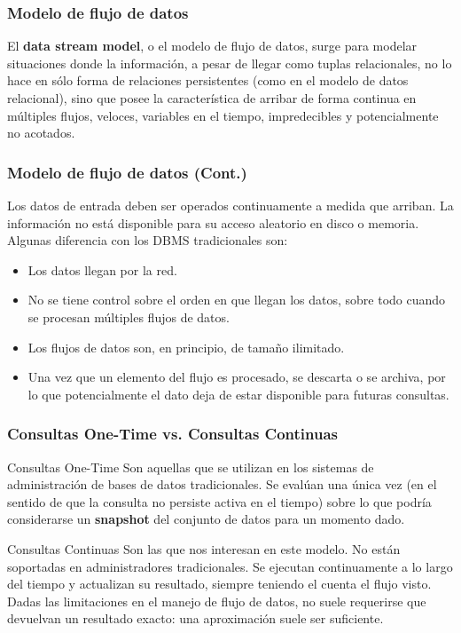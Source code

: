 
\begin{frame}
\frametitle{Modelo de flujo de datos}
\begin{block}{}
El \textbf{data stream model}, o el modelo de flujo de datos, surge para modelar situaciones donde la información, a pesar de llegar como tuplas relacionales, no lo hace en sólo forma de relaciones persistentes (como en el modelo de datos relacional), sino que posee la característica de arribar de forma continua en múltiples flujos, veloces, variables en el tiempo, impredecibles y potencialmente no acotados.\
\end{block}
\end{frame}

\begin{frame}
\frametitle{Modelo de flujo de datos (Cont.)}
Los datos de entrada deben ser operados continuamente a medida que arriban. La información no está disponible para su acceso aleatorio en disco o memoria. Algunas diferencia con los DBMS tradicionales son:
\begin{itemize}
\item Los datos llegan por la red.
\item No se tiene control sobre el orden en que llegan los datos, sobre todo cuando se procesan múltiples flujos de datos.
\item Los flujos de datos son, en principio, de tamaño ilimitado.
\item Una vez que un elemento del flujo es procesado, se descarta o se archiva, por lo que potencialmente el dato deja de estar disponible para futuras consultas.
\end{itemize} 
\end{frame}

\begin{frame}
\frametitle{Consultas One-Time vs. Consultas Continuas}

\begin{block}{Consultas One-Time}
Son aquellas que se utilizan en los sistemas de administración de bases de datos tradicionales. Se evalúan una única vez (en el sentido de que la consulta no persiste activa en el tiempo) sobre lo que podría considerarse un \textbf{snapshot} del conjunto de datos para un momento dado.
\end{block}

\begin{block}{Consultas Continuas}
Son las que nos interesan en este modelo. No están soportadas en administradores tradicionales. Se ejecutan continuamente a lo largo del tiempo y actualizan su resultado, siempre teniendo el cuenta el flujo visto. Dadas las limitaciones en el manejo de flujo de datos, no suele requerirse que devuelvan un resultado exacto: una aproximación suele ser suficiente.
\end{block}

\end{frame}

